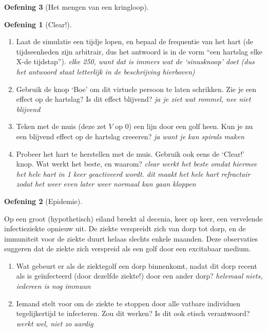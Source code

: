 \documentclass[
  a4paper,
]{scrbook}
\providecommand{\tightlist}{%
  \setlength{\itemsep}{0pt}\setlength{\parskip}{0pt}}\usepackage{longtable,booktabs,array}
\theoremstyle{definition}
\newtheorem{exercise}{Oefening}[chapter]
\theoremstyle{remark}
\begin{document}
\begin{exercise}[Het mengen van een
kringloop]
\begin{exercise}[Clear!]
\begin{enumerate}
\def\labelenumi{\alph{enumi}.}
\tightlist
\item
  Laat de simulatie een tijdje lopen, en bepaal de frequentie van het
  hart (de tijdseenheden zijn arbitrair, dus het antwoord is in de vorm
  ``een hartslag elke X-de tijdstap''). \emph{elke 250, want dat is
  immers wat de `sinusknoop' doet (dus het antwoord staat letterlijk in
  de beschrijving hierboven)}
\item
  Gebruik de knop `Boe' om dit virtuele persoon te laten schrikken. Zie
  je een effect op de hartslag? Is dit effect blijvend? \emph{ja je ziet
  wat rommel, nee niet blijvend}
\item
  Teken met de muis (deze zet \(V\) op 0) een lijn door een golf heen.
  Kun je nu een blijvend effect op de hartslag creeeren? \emph{ja want
  je kan spirals maken}
\item
  Probeer het hart te herstellen met de muis. Gebruik ook eens de
  `Clear!' knop. Wat werkt het beste, en waarom? \emph{clear werkt het
  beste omdat hiermee het hele hart in 1 keer geactiveerd wordt. dit
  maakt het hele hart refractair zodat het weer even later weer normaal
  kan gaan kloppen}
\end{enumerate}

\end{exercise}

\begin{exercise}[Epidemie]\protect\hypertarget{exr-epidemievraag}{}\label{exr-epidemievraag}

Op een groot (hypothetisch) eiland breekt al decenia, keer op keer, een
vervelende infectieziekte opnieuw uit. De ziekte verspreidt zich van
dorp tot dorp, en de immuniteit voor de ziekte duurt helaas slechts
enkele maanden. Deze observaties suggeren dat de ziekte zich verspreid
als een golf door een excitabaar medium.

\begin{enumerate}
\def\labelenumi{\alph{enumi}.}
\tightlist
\item
  Wat gebeurt er als de ziektegolf een dorp binnenkomt, nadat dit dorp
  recent als is geïnfecteerd (door dezelfde ziekte!) door een ander
  dorp? \emph{helemaal niets, iedereen is nog immuun}
\item
  Iemand stelt voor om de ziekte te stoppen door alle vatbare individuen
  tegelijkertijd te infecteren. Zou dit werken? Is dit ook etisch
  verantwoord? \emph{werkt wel, niet zo aardig}
\end{enumerate}


\end{exercise}
\end{exercise}
\end{document}
